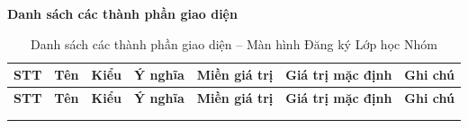 \documentclass[a4paper,12pt]{article}
\begin{document}
\par\medskip\noindent\textbf{Danh sách các thành phần giao diện}\par\smallskip
{\footnotesize
\setlength{\tabcolsep}{2.5pt}
\begin{longtable}{|c|L{2.95cm}|L{1.85cm}|L{2.95cm}|L{2.75cm}|L{1.90cm}|L{2.05cm}|}
\hline
\textbf{STT} & \textbf{Tên} & \textbf{Kiểu} & \textbf{Ý nghĩa} & \textbf{Miền giá trị} & \textbf{Giá trị mặc định} & \textbf{Ghi chú} \\
\hline
\endfirsthead
\hline
\textbf{STT} & \textbf{Tên} & \textbf{Kiểu} & \textbf{Ý nghĩa} & \textbf{Miền giá trị} & \textbf{Giá trị mặc định} & \textbf{Ghi chú} \\
\hline
\endhead
\hline
\endfoot
\hline
\caption{Danh sách các thành phần giao diện -- Màn hình Đăng ký Lớp học Nhóm} \\
\endlastfoot


\end{longtable}}
\end{document}
